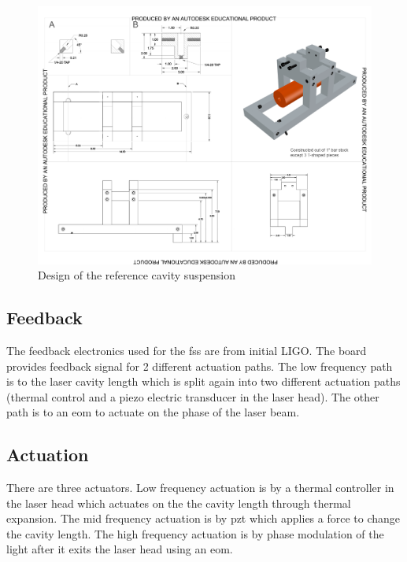 \begin{figure}[htbp]
	\centering
		\includegraphics[width=15cm]{./figures/refcavsusdesign.pdf}
	\caption[Reference Cavity Suspension Design]{Design of the reference cavity suspension}
	\label{fig:refcav_sus}
\end{figure}


\subsection{Feedback}
The feedback electronics used for the \ac{fss} are from initial LIGO. The board
provides feedback signal for 2 different actuation paths. The low frequency path
is to the laser cavity length which is split again into two different actuation
paths (thermal control and a piezo electric transducer in the laser head). The
other path is to an \ac{eom} to actuate on the phase of the laser beam.

\subsection{Actuation}

There are three actuators. Low frequency actuation is by a thermal controller in
the laser head which actuates on the the cavity length through thermal expansion.
The mid frequency actuation is by \ac{pzt} which applies a force to change the
cavity length. The high frequency actuation is by phase modulation of the light
after it exits the laser head using an \ac{eom}.


